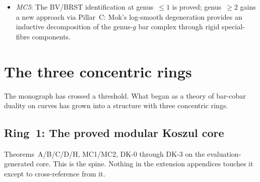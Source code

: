 \begin{remark}
\begin{itemize}
  PBW bridge (Theorem~\ref{thm:uniform-pbw-bridge}) connects MC1
  to MC4: uniform PBW degeneration plus quotient stabilization
  implies completed bar-cobar duality.
  The remaining example-specific task is coefficient stabilization on
  finite windows and H-level target identification, not a formal
  completion theorem.
\item \emph{MC5}:  The BV/BRST identification at genus~$\leq 1$ is
  proved; genus~$\geq 2$ gains a new approach via Pillar~C: Mok's
  log-smooth degeneration provides an inductive decomposition of the
  genus-$g$ bar complex through rigid special-fibre components.
\end{itemize}
\end{remark}

\section{The three concentric rings}
\label{sec:three-rings}

The monograph has crossed a threshold.  What began as a theory of
bar-cobar duality on curves has grown into a structure with three
concentric rings.

\subsection*{Ring~1: The proved modular Koszul core}
Theorems~A/B/C/D/H, MC1/MC2, DK-0 through DK-3 on the
evaluation-generated core.  This is the spine.  Nothing in
the extension appendices touches it except to cross-reference
from it.

